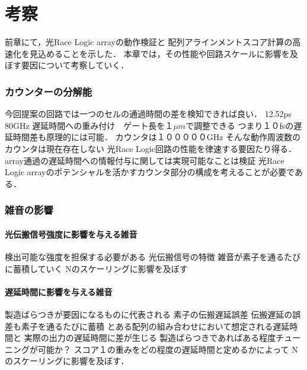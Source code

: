 \chapter{考察}
前章にて，光Race Logic arrayの動作検証と
配列アラインメントスコア計算の高速化を見込めることを示した．
本章では，その性能や回路スケールに影響を及ぼす要因について考察していく．
\subsection{カウンターの分解能}
今回提案の回路では一つのセルの通過時間の差を検知できれば良い．
12.52ps 80GHz
遅延時間への重み付け　ゲート長を１$\mu m$で調整できる
つまり１０fsの遅延時間差も原理的には可能．
カウンタは１０００００GHz
そんな動作周波数のカウンタは現在存在しない
光Race Logic回路の性能を律速する要因たり得る．
array通過の遅延時間への情報付与に関しては実現可能なことは検証
光Race Logic arrayのポテンシャルを活かすカウンタ部分の構成を考えることが必要である．
\subsection{雑音の影響}
\subsubsection{光伝搬信号強度に影響を与える雑音}
検出可能な強度を担保する必要がある
光伝搬信号の特徴
雑音が素子を通るたびに蓄積していく
Nのスケーリングに影響を及ぼす
\subsubsection{遅延時間に影響を与える雑音}
製造ばらつきが要因になるものに代表される
素子の伝搬遅延誤差
伝搬遅延の誤差も素子を通るたびに蓄積
とある配列の組み合わせにおいて想定される遅延時間と
実際の出力の遅延時間に差が生じる
製造ばらつきであればある程度チューニングが可能か？
スコア１の重みをどの程度の遅延時間と定めるかによって
Nのスケーリングに影響を及ぼす．

